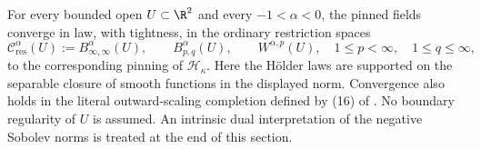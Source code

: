\begin{proposition}\label{prop:negative-regularity}
For every bounded open \(U\subset\R^2\) and every \(-1<\alpha<0\),
the pinned fields converge in law, with tightness, in the ordinary
restriction spaces
\[
 \mathcal C^\alpha_{\mathrm{res}}(U):=B^\alpha_{\infty,\infty}(U),\qquad
 B^\alpha_{p,q}(U),\qquad W^{\alpha,p}(U),
 \quad 1\le p<\infty,\quad1\le q\le\infty,
\]
to the corresponding pinning of \(\mathcal H_\kappa\).
Here the Hölder laws are supported on the separable closure of smooth
functions in the displayed norm. Convergence also holds in the literal
outward-scaling completion defined by (16) of
\cite[Definition~2.6(iii)]{DKLM2026}. No boundary regularity of \(U\) is
assumed. An intrinsic dual interpretation of the negative Sobolev norms
is treated at the end of this section.
\end{proposition}

